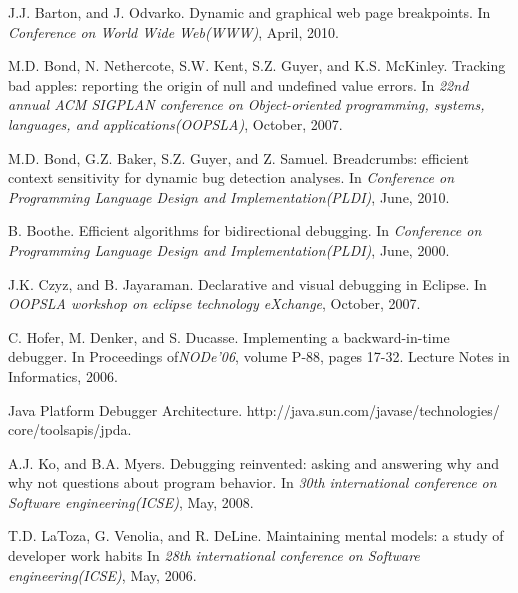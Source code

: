 \documentclass[runningheads,a4paper]{llncs}
\begin{document}
\begin{thebibliography}{16}

J.J. Barton, and J. Odvarko. \newblock Dynamic and graphical web page breakpoints.
\newblock In \emph{Conference on World Wide Web(WWW)},
April, 2010.

M.D. Bond, N. Nethercote, S.W. Kent, S.Z. Guyer, and K.S. McKinley. \newblock Tracking bad apples: reporting the origin of null and undefined value errors.
\newblock In \emph{22nd annual ACM SIGPLAN conference on Object-oriented programming, systems, languages, and applications(OOPSLA)},
October, 2007.

M.D. Bond, G.Z. Baker, S.Z. Guyer, and Z. Samuel. \newblock Breadcrumbs: efficient context sensitivity for dynamic bug detection analyses.
\newblock In \emph{Conference on Programming Language Design and Implementation(PLDI)},
June, 2010.

B. Boothe. \newblock Efficient algorithms for bidirectional debugging.
\newblock In \emph{Conference on Programming Language Design and Implementation(PLDI)},
June, 2000.

J.K. Czyz, and B. Jayaraman. \newblock Declarative and visual debugging in Eclipse.
\newblock In \emph{OOPSLA workshop on eclipse technology eXchange},
October, 2007.



C. Hofer, M. Denker, and S. Ducasse. \newblock Implementing a backward-in-time debugger.
\newblock In Proceedings of\emph{NODe'06},
volume P-88, pages 17-32. Lecture Notes in Informatics, 2006.

Java Platform Debugger Architecture. \newblock http://java.sun.com/javase/technologies/ core/toolsapis/jpda.

A.J. Ko, and B.A. Myers. \newblock Debugging reinvented: asking and answering why and why not questions about program behavior.
\newblock In \emph{30th international conference on Software engineering(ICSE)},
May, 2008.

T.D. LaToza, G. Venolia, and R. DeLine. \newblock Maintaining mental models: a study of developer work habits
\newblock In \emph{28th international conference on Software engineering(ICSE)},
May, 2006.


\end{thebibliography}
\end{document}
